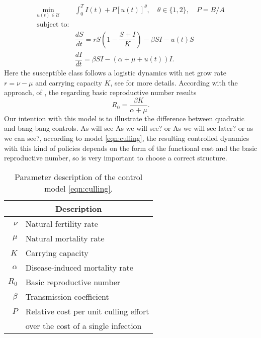 \begin{equation}\label{eqn:culling}
	\begin{aligned}
  \min_{u(t)\in \mathcal{U}}
    &
    \int_0^T
      I(t) + P [u(t)]^{\theta}, \quad \theta \in \{1,2\},
      \quad P = B/A
  \\ \textrm{subject to:} &
  \\
    &\dfrac{dS}{dt} =
			r S 
			\left (
				1 - \dfrac{S+I}{K}
			\right)
			 - \beta SI - u(t) S
		\\
		&\dfrac{dI}{dt} =
			\beta SI - (\alpha + \mu + u(t)) I.
	\end{aligned}
\end{equation}
%
Here the susceptible class follows a logistic dynamics with net grow rate
$r = \nu - \mu$ and carrying capacity $K$, see 
for more details. According with the approach, 
of \citet{VandenDriessche2017}, the regarding basic reproductive number results
$$
  R_0 = \frac{\beta K}{\alpha + \mu}.
$$ 
  Our intention with this model is to illustrate the difference between
quadratic and bang-bang controls. As will see {\color{red} As we will see? or As we will see later? or as we can see?}, according to model 
\eqref{eqn:culling}, the resulting controlled dynamics with this kind of 
policies depends on the form of the functional cost and the basic reproductive 
number, so is very important to choose a correct structure.
\begin{table}
  \begin{center}
    \begin{tabular}{@{}rl@{}}
        \toprule
      \multicolumn{2}{c}{\bf{Description}}
      \\
      \midrule
      $\nu$
        &
          Natural fertility rate
      \\
      $\mu$
        & Natural mortality rate
      \\
      $K$
        & Carrying capacity
      \\
      $\alpha$
        & Disease-induced mortality rate
      \\
      $R_0$
        & Basic reproductive number
      \\
      $\beta$
        & Transmission coefficient
      \\
      $P$
        & Relative cost per unit culling effort \\
        & over the cost of a single infection
      \\
      \bottomrule
    \end{tabular}
  \end{center}
  \caption{Parameter description of the control model \eqref{eqn:culling}.}
  \label{tbl:culling_parameter_des}
\end{table}